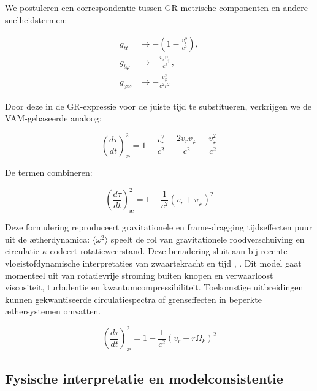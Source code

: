 We postuleren een correspondentie tussen GR-metrische componenten en andere snelheidstermen:

\begin{equation}
\begin{aligned}
g_{tt} &\rightarrow -\left(1 - \frac{v_r^2}{c^2}\right), \\
g_{t\varphi} &\rightarrow -\frac{v_r v_\varphi}{c^2}, \\
g_{\varphi\varphi} &\rightarrow -\frac{v_\varphi^2}{c^2 r^2}
\end{aligned}
\label{eq:VAM_metric_terms}
\end{equation}

Door deze in de GR-expressie voor de juiste tijd te substitueren, verkrijgen we de VAM-gebaseerde analoog:

\begin{equation}
\left( \frac{d\tau}{dt} \right)^2_\text{\ae} = 1 - \frac{v_r^2}{c^2} - \frac{2v_r v_\varphi}{c^2} - \frac{v_\varphi^2}{c^2}
\label{eq:VAM_proper_time}
\end{equation}

De termen combineren:

\begin{equation}
\left( \frac{d\tau}{dt} \right)^2_\text{\ae} = 1 - \frac{1}{c^2}(v_r + v_\varphi)^2
\label{eq:VAM_proper_time_combined}
\end{equation}

Deze formulering reproduceert gravitationele en frame-dragging tijdseffecten puur uit de ætherdynamica: $\langle \omega^2 \rangle$ speelt de rol van gravitationele roodverschuiving en circulatie $\kappa$ codeert rotatieweerstand. Deze benadering sluit aan bij recente vloeistofdynamische interpretaties van zwaartekracht en tijd \cite{barcelo2011analogue}, \cite{fedi2017gravity}.
Dit model gaat momenteel uit van rotatievrije stroming buiten knopen en verwaarloost viscositeit, turbulentie en kwantumcompressibiliteit. Toekomstige uitbreidingen kunnen gekwantiseerde circulatiespectra of grenseffecten in beperkte æthersystemen omvatten.

\begin{equation}
\boxed{\left( \frac{d\tau}{dt} \right)^2_\text{\ae} = 1 - \frac{1}{c^2}(v_r + r\Omega_k)^2}
\label{eq:VAM_proper_time_final}
\end{equation}

\subsection{Fysische interpretatie en modelconsistentie}

